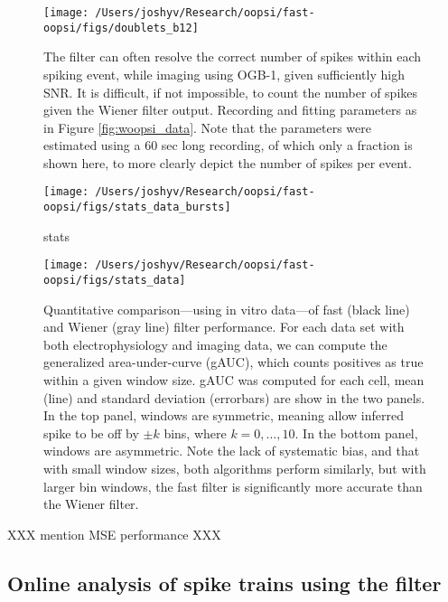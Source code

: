 \begin{figure}[h!]
\centering \texttt{[image: /Users/joshyv/Research/oopsi/fast-oopsi/figs/doublets\_b12]}
\caption[\foopsi filter outperforms Wiener filter on multi-spike events]{The \foopsi filter can often resolve the correct number of spikes within each spiking event, while imaging using OGB-1, given sufficiently high SNR.  It is difficult, if not impossible, to count the number of spikes given the Wiener filter output.  Recording and fitting parameters as in Figure \ref{fig:woopsi_data}. Note that the parameters were estimated using a 60 sec long recording, of which only a fraction is shown here, to more clearly depict the number of spikes per event.  } \label{fig:woopsi_data_doublets}
\end{figure}

\begin{figure}[h!]
\centering \texttt{[image: /Users/joshyv/Research/oopsi/fast-oopsi/figs/stats\_data\_bursts]}
\caption{stats} \label{fig:stats-data-bursts}
\end{figure}

\begin{figure}[h!]
\centering \texttt{[image: /Users/joshyv/Research/oopsi/fast-oopsi/figs/stats\_data]}
\caption{Quantitative comparison---using in vitro data---of fast (black line) and Wiener (gray line) filter performance.  For each data set with both electrophysiology and imaging data, we can compute the generalized area-under-curve (gAUC), which counts positives as true within a given window size.  gAUC was computed for each cell, mean (line) and standard deviation (errorbars) are show in the two panels.  In the top panel, windows are symmetric, meaning allow inferred spike to be off by $\pm k$ bins, where $k=0,\ldots, 10$.  In the bottom panel, windows are asymmetric.  Note the lack of systematic bias, and that with small window sizes, both algorithms perform similarly, but with larger bin windows, the fast filter is significantly more accurate than the Wiener filter. } \label{fig:stats-data}
\end{figure}

XXX mention MSE performance XXX




\subsection{Online analysis of spike trains using the \foopsi filter}

